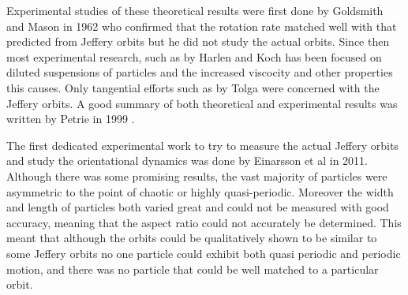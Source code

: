 Experimental studies of these theoretical results were first done by Goldsmith and Mason in 1962\cite{Mason} who confirmed that the rotation rate matched well with that predicted from Jeffery orbits but he did not study the actual orbits. Since then most experimental research, such as by Harlen and Koch\cite{fibersspension} has been focused on diluted suspensions of particles and the increased viscocity and other properties this causes. Only tangential efforts such as by Tolga\cite{Tolga} were concerned with the Jeffery orbits. A good summary of both theoretical and experimental results was written by Petrie in 1999 \cite{Petrie}.

The first dedicated experimental work to try to measure the actual Jeffery orbits and study the orientational dynamics was done by Einarsson et al \cite{JonasExperiment} in 2011. Although there was some promising results, the vast majority of particles were asymmetric to the point of chaotic or highly quasi-periodic. Moreover the width and length of particles both varied great and could not be measured with good accuracy, meaning that the aspect ratio could not accurately be determined. This meant that although the orbits could be qualitatively shown to be similar to some Jeffery orbits no one particle could exhibit both quasi periodic and periodic motion, and there was no particle that could be well matched to a particular orbit. 

